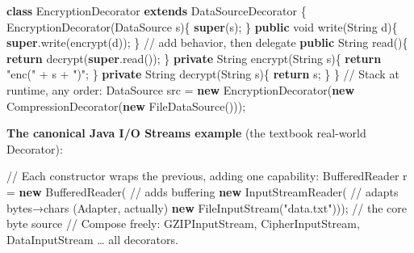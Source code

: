 \documentclass[11pt]{article}
\newenvironment{Shaded}{\begin{snugshade}}{\end{snugshade}}
\newcommand{\BuiltInTok}[1]{\textcolor[rgb]{0.50,0.55,0.55}{#1}}
\newcommand{\CommentTok}[1]{\textcolor[rgb]{0.48,0.49,0.49}{#1}}
\newcommand{\ControlFlowTok}[1]{\textcolor[rgb]{0.99,0.74,0.29}{\textbf{#1}}}
\newcommand{\DataTypeTok}[1]{\textcolor[rgb]{0.16,0.50,0.73}{#1}}
\newcommand{\FunctionTok}[1]{\textcolor[rgb]{0.56,0.27,0.68}{#1}}
\newcommand{\KeywordTok}[1]{\textcolor[rgb]{0.81,0.81,0.76}{\textbf{#1}}}
\newcommand{\NormalTok}[1]{\textcolor[rgb]{0.81,0.81,0.76}{#1}}
\newcommand{\OperatorTok}[1]{\textcolor[rgb]{0.81,0.81,0.76}{#1}}
\newcommand{\StringTok}[1]{\textcolor[rgb]{0.96,0.31,0.31}{#1}}
\begin{document}
\begin{Shaded}
\begin{Highlighting}[]
\KeywordTok{class}\NormalTok{ EncryptionDecorator }\KeywordTok{extends}\NormalTok{ DataSourceDecorator }\OperatorTok{\{}
    \FunctionTok{EncryptionDecorator}\OperatorTok{(}\BuiltInTok{DataSource}\NormalTok{ s}\OperatorTok{)\{} \KeywordTok{super}\OperatorTok{(}\NormalTok{s}\OperatorTok{);} \OperatorTok{\}}
    \KeywordTok{public} \DataTypeTok{void} \FunctionTok{write}\OperatorTok{(}\BuiltInTok{String}\NormalTok{ d}\OperatorTok{)\{} \KeywordTok{super}\OperatorTok{.}\FunctionTok{write}\OperatorTok{(}\FunctionTok{encrypt}\OperatorTok{(}\NormalTok{d}\OperatorTok{));} \OperatorTok{\}}   \CommentTok{// add behavior, then delegate}
    \KeywordTok{public} \BuiltInTok{String} \FunctionTok{read}\OperatorTok{()\{} \ControlFlowTok{return} \FunctionTok{decrypt}\OperatorTok{(}\KeywordTok{super}\OperatorTok{.}\FunctionTok{read}\OperatorTok{());} \OperatorTok{\}}
    \KeywordTok{private} \BuiltInTok{String} \FunctionTok{encrypt}\OperatorTok{(}\BuiltInTok{String}\NormalTok{ s}\OperatorTok{)\{} \ControlFlowTok{return} \StringTok{"enc("} \OperatorTok{+}\NormalTok{ s }\OperatorTok{+} \StringTok{")"}\OperatorTok{;} \OperatorTok{\}}
    \KeywordTok{private} \BuiltInTok{String} \FunctionTok{decrypt}\OperatorTok{(}\BuiltInTok{String}\NormalTok{ s}\OperatorTok{)\{} \ControlFlowTok{return}\NormalTok{ s}\OperatorTok{;} \OperatorTok{\}}
\OperatorTok{\}}
\CommentTok{// Stack at runtime, any order:}
\BuiltInTok{DataSource}\NormalTok{ src }\OperatorTok{=} \KeywordTok{new} \FunctionTok{EncryptionDecorator}\OperatorTok{(}\KeywordTok{new} \FunctionTok{CompressionDecorator}\OperatorTok{(}\KeywordTok{new} \BuiltInTok{FileDataSource}\OperatorTok{()));}
\end{Highlighting}
\end{Shaded}

\textbf{The canonical Java I/O Streams example} (the textbook real-world Decorator):


\begin{Shaded}
\begin{Highlighting}[]
\CommentTok{// Each constructor wraps the previous, adding one capability:}
\BuiltInTok{BufferedReader}\NormalTok{ r }\OperatorTok{=} \KeywordTok{new} \BuiltInTok{BufferedReader}\OperatorTok{(}      \CommentTok{// adds buffering}
    \KeywordTok{new} \BuiltInTok{InputStreamReader}\OperatorTok{(}                  \CommentTok{// adapts bytes→chars (Adapter, actually)}
        \KeywordTok{new} \BuiltInTok{FileInputStream}\OperatorTok{(}\StringTok{"data.txt"}\OperatorTok{)));}  \CommentTok{// the core byte source}
\CommentTok{// Compose freely: GZIPInputStream, CipherInputStream, DataInputStream … all decorators.}
\end{Highlighting}
\end{Shaded}
\end{document}
